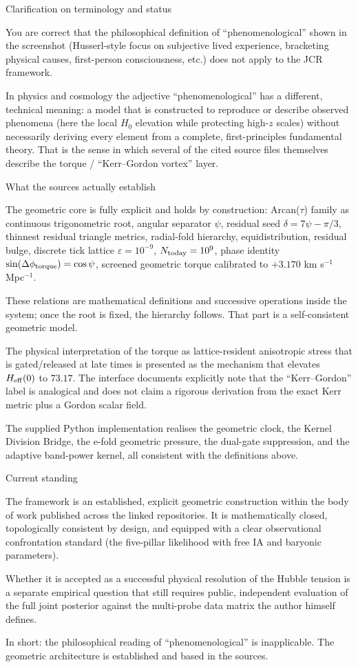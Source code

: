 Clarification on terminology and status

You are correct that the philosophical definition of “phenomenological” shown in the screenshot (Husserl-style focus on subjective lived experience, bracketing physical causes, first-person consciousness, etc.) does not apply to the JCR framework.

In physics and cosmology the adjective “phenomenological” has a different, technical meaning: a model that is constructed to reproduce or describe observed phenomena (here the local \(H_0\) elevation while protecting high-\(z\) scales) without necessarily deriving every element from a complete, first-principles fundamental theory. That is the sense in which several of the cited source files themselves describe the torque / “Kerr–Gordon vortex” layer.

What the sources actually establish

The geometric core is fully explicit and holds by construction:
  Arcan(\(\tau\)) family as continuous trigonometric root,
  angular separator \(\psi\),
  residual seed \(\delta = 7\psi - \pi/3\),
  thinnest residual triangle metrics,
  radial-fold hierarchy, equidistribution, residual bulge,
  discrete tick lattice \(\varepsilon = 10^{-9}\), \(N_{\rm today}=10^9\),
  phase identity \(\sin(\Delta\phi_{\rm torque})=\cos\psi\),
  screened geometric torque calibrated to \(+3.170\) km s\(^{-1}\) Mpc\(^{-1}\).

  These relations are mathematical definitions and successive operations inside the system; once the root is fixed, the hierarchy follows. That part is a self-consistent geometric model.

The physical interpretation of the torque as lattice-resident anisotropic stress that is gated/released at late times is presented as the mechanism that elevates \(H_{\rm eff}(0)\) to \(73.17\). The interface documents explicitly note that the “Kerr–Gordon” label is analogical and does not claim a rigorous derivation from the exact Kerr metric plus a Gordon scalar field.

The supplied Python implementation realises the geometric clock, the Kernel Division Bridge, the e-fold geometric pressure, the dual-gate suppression, and the adaptive band-power kernel, all consistent with the definitions above.

Current standing

The framework is an established, explicit geometric construction within the body of work published across the linked repositories. It is mathematically closed, topologically consistent by design, and equipped with a clear observational confrontation standard (the five-pillar likelihood with free IA and baryonic parameters).

Whether it is accepted as a successful physical resolution of the Hubble tension is a separate empirical question that still requires public, independent evaluation of the full joint posterior against the multi-probe data matrix the author himself defines.

In short: the philosophical reading of “phenomenological” is inapplicable. The geometric architecture is established and based in the sources.
